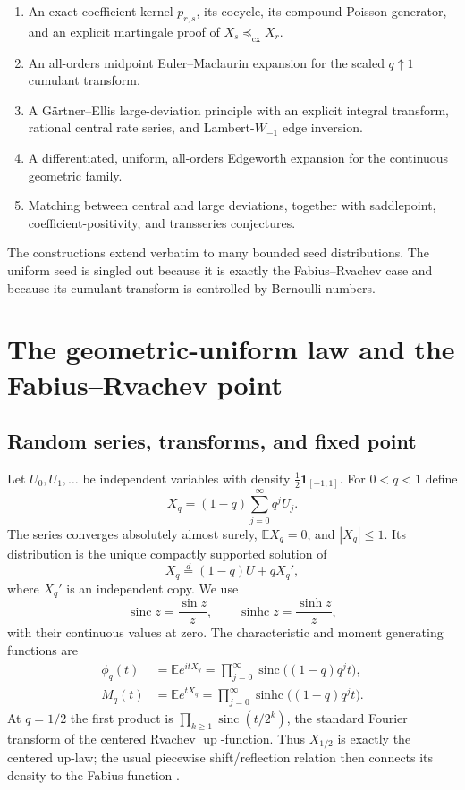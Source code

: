 \documentclass[11pt,a4paper]{article}
\theoremstyle{definition}
\newcommand{\E}{\mathbb{E}}
\newcommand{\sinc}{\operatorname{sinc}}
\newcommand{\sinhc}{\operatorname{sinhc}}
\newcommand{\Up}{\operatorname{up}}
\newcommand{\1}{\mathbf{1}}
\begin{document}
\begin{enumerate}[label=\textbf{R\arabic*.}]
\item An exact coefficient kernel $p_{r,s}$, its cocycle, its
compound-Poisson generator, and an explicit martingale proof of
$X_s\preceq_{\mathrm{cx}}X_r$.
\item An all-orders midpoint Euler--Maclaurin expansion for the scaled
$q\uparrow1$ cumulant transform.
\item A G\"artner--Ellis large-deviation principle with an explicit integral
transform, rational central rate series, and Lambert-$W_{-1}$ edge inversion.
\item A differentiated, uniform, all-orders Edgeworth expansion for the
continuous geometric family.
\item Matching between central and large deviations, together with
saddlepoint, coefficient-positivity, and transseries conjectures.
\end{enumerate}

The constructions extend verbatim to many bounded seed distributions.  The
uniform seed is singled out because it is exactly the Fabius--Rvachev case
and because its cumulant transform is controlled by Bernoulli numbers.

\section{The geometric-uniform law and the Fabius--Rvachev point}
\label{sec:setup}

\subsection{Random series, transforms, and fixed point}

Let $U_0,U_1,\dots$ be independent variables with density
$\frac12\1_{[-1,1]}$.  For $0<q<1$ define
\begin{equation}
  X_q=(1-q)\sum_{j=0}^{\infty}q^jU_j.
  \label{eq:Xq}
\end{equation}
The series converges absolutely almost surely, $\E X_q=0$, and
$|X_q|\le1$.  Its distribution is the unique compactly supported solution of
\begin{equation}
  X_q\overset{d}= (1-q)U+qX_q',
  \label{eq:perpetuity}
\end{equation}
where $X_q'$ is an independent copy.  We use
\[
 \sinc z=\frac{\sin z}{z},\qquad
 \sinhc z=\frac{\sinh z}{z},
\]
with their continuous values at zero.  The characteristic and moment
generating functions are
\begin{align}
 \phi_q(t)&=\E e^{itX_q}
   =\prod_{j=0}^{\infty}\sinc\bigl((1-q)q^jt\bigr),
   \label{eq:cf}\\
 M_q(t)&=\E e^{tX_q}
   =\prod_{j=0}^{\infty}\sinhc\bigl((1-q)q^jt\bigr).
   \label{eq:mgf}
\end{align}
At $q=1/2$ the first product is
$\prod_{k\ge1}\sinc(t/2^k)$, the standard Fourier transform of the centered
Rvachev $\Up$-function.  Thus $X_{1/2}$ is exactly the centered up-law; the
usual piecewise shift/reflection relation then connects its density to the
Fabius function \cite{Fabius1966,Rvachev1990,Arias2018}.
\end{document}
